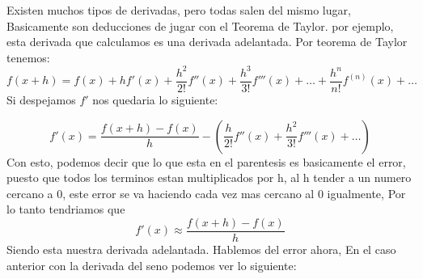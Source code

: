 \documentclass[11pt,a4paper]{article}
\begin{document}
Existen muchos tipos de derivadas, pero todas salen del mismo lugar, Basicamente son deducciones
de jugar con el Teorema de Taylor. por ejemplo, esta derivada que calculamos es una derivada
adelantada.
\bigskip
Por teorema de Taylor tenemos:
\begin{equation}
 f(x+h) = f(x) + hf'(x) + \frac{h^2}{2!}f''(x) + \frac{h^3}{3!}f'''(x) + \dots + \frac{h^n}{n!}f^{(n)}(x) + \dots
\end{equation}
Si despejamos $f'$ nos quedaria lo siguiente:

\begin{equation}
    f'(x) = \frac{f(x+h) - f(x)}{h} - \left( \frac{h}{2!}f''(x) + \frac{h^2}{3!}f'''(x) + \dots \right)
\end{equation}
Con esto, podemos decir que lo que esta en el parentesis es basicamente el error, puesto que todos
los terminos estan multiplicados por h, al h tender a un numero cercano a 0, este error se va
haciendo cada vez mas cercano al 0 igualmente, Por lo tanto tendriamos que
\begin{equation}
    f'(x) \approx \frac{f(x+h) - f(x)}{h}
\end{equation}
Siendo esta nuestra derivada adelantada. Hablemos del error ahora, En el caso anterior con la 
derivada del seno podemos ver lo siguiente:

\begin{lstlisting}

\end{lstlisting}
\end{document}
